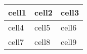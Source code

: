 \begin{gosttable} %
    \begin{table}[h!] %
        \centering %
        \caption{} %
        \begin{tabularx}{0.8\textwidth}{
        | >{\raggedright\arraybackslash}X 
        | >{\centering\arraybackslash}  X 
        | >{\raggedleft\arraybackslash} X |}
            \hline
            cell1 & cell2 & cell3 \\ 
            \hline
            cell4 & cell5 & cell6 \\ 
            \hline
            cell7 & cell8 & cell9 \\ 
            \hline
        \end{tabularx}
    \end{table}
\end{gosttable}